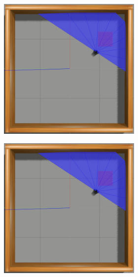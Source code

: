 \begin{figure}[H]
\begin{center}
\begin{subfigure}[b]{0.60\textwidth}
\begin{subfigure}[b]{0.24\textwidth}
        \end{subfigure}
        \hfill
        \begin{subfigure}[b]{0.24\textwidth}
            \includegraphics[width=\textwidth]{imagens/simulated_envs/sim_env1_ddpg/7.png}
        \end{subfigure}
        \hfill
        \begin{subfigure}[b]{0.24\textwidth}
            \includegraphics[width=\textwidth]{imagens/simulated_envs/sim_env1_ddpg/7.png}

\end{subfigure}
\end{subfigure}
\end{center}
\end{figure}
